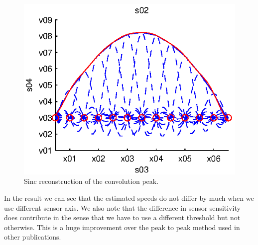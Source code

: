 \begin{figure}[!ht]
  \centering
  	\begin{minipage}{0.45\linewidth}
  \centering
  
   \includegraphics[width=\linewidth]{images/reconst}
  \caption[Sinc reconstruction]{Sinc reconstruction of the convolution peak.}
  \label{fig:reconst}
  \end{minipage}
%    
 \end{figure}
 
 In the result we can see that the estimated speeds do not differ by much when we use different sensor axis. We also note that the difference in sensor sensitivity does contribute in the sense that we have to use a different threshold but not otherwise. This is a huge improvement over the peak to peak method used in other publications.
 
 
